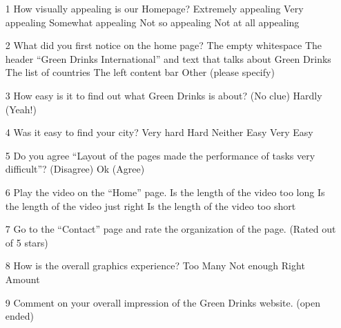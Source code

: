 \documentclass[12pt]{article}
\begin{document}
\begin{itemize}
\item[1] How visually appealing is our Homepage?
\subitem Extremely appealing
\subitem Very appealing
\subitem Somewhat appealing
\subitem Not so appealing
\subitem Not at all appealing

\item[2] What did you first notice on the home page?
\subitem The empty whitespace
\subitem The header “Green Drinks International” and text that talks about Green Drinks
\subitem  The list of countries
\subitem The left content bar
\subitem Other (please specify)


\item[3] How easy is it to find out what Green Drinks is about?
(No clue)
\subitem Hardly
(Yeah!)

\item[4] Was it easy to find your city?
\subitem Very hard
\subitem Hard
\subitem Neither
\subitem Easy 
\subitem Very Easy 

\item[5] Do you agree “Layout of the pages made the performance of tasks very difficult”?
(Disagree)
\subitem Ok
(Agree)

\item[6] Play the video on the “Home” page.
\subitem Is the length of the video too long
\subitem Is the length of the video just right
\subitem Is the length of the video too short

\item[7] Go to the “Contact” page and rate the organization of the page.
\subitem* (Rated out of 5 stars)

\item[8] How is the overall graphics experience?
\subitem Too Many 
\subitem Not enough
\subitem Right Amount

\item[9]  Comment on your overall impression of the Green Drinks website.
\subitem* (open ended)
\end{itemize}
\end{document}
